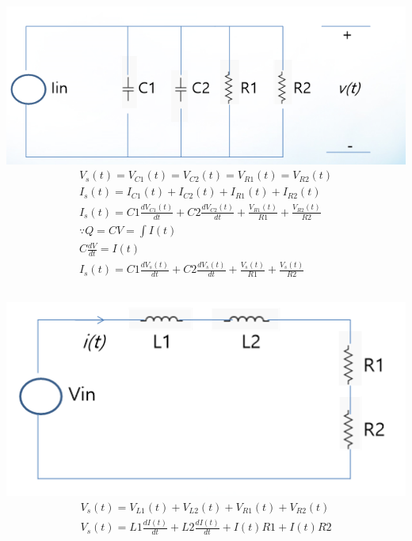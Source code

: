 \documentclass[12pt,a4paper]{article}
\begin{document}
\includegraphics[width=\textwidth]{2.png}
\begin{gather*}
V_s(t) = V_{C1}(t) = V_{C2}(t) = V_{R1}(t) = V_{R2}(t)\\
I_s(t) = I_{C1}(t) + I_{C2}(t) + I_{R1}(t) + I_{R2}(t)\\
I_s(t) = C1\frac{dV_{C1}(t)}{dt} + C2\frac{dV_{C2}(t)}{dt} + \frac{V_{R1}(t)}{R1} + \frac{V_{R2}(t)}{R2}\\
\because Q = CV = \int I(t)\\
C\frac{dV}{dt} = I(t)\\
I_s(t) = C1\frac{dV_{s}(t)}{dt} + C2\frac{dV_{s}(t)}{dt} + \frac{V_{s}(t)}{R1} + \frac{V_{s}(t)}{R2}\\
\end{gather*}	
	
\subsubsection{}
\includegraphics[width=\textwidth]{3.png}	
\begin{gather*}
V_s(t) = V_{L1}(t) + V_{L2}(t) + V_{R1}(t) + V_{R2}(t)\\
V_s(t) = L1\frac{dI(t)}{dt} + L2\frac{dI(t)}{dt} + I(t)R1 + I(t)R2
\end{gather*}

	
	
	
	
\end{document}
